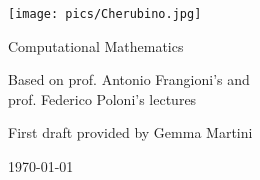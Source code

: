 \documentclass[preview,12pt]{article}
\begin{document}
\begin{titlepage}
\begin{center}
\vspace{3cm}

\Large

\vspace{2cm}

\texttt{[image: pics/Cherubino.jpg]}

\vspace{2.5cm}

{\Huge \sc Computational Mathematics}

\vspace{2cm}
Based on prof. Antonio Frangioni's and\\
  prof. Federico Poloni's lectures

\vspace{2cm}
First draft provided by Gemma Martini
\vfill

\today

\end{center}
\end{titlepage}


\tableofcontents
\let\tableofcontents\relax

\newpage



\newpage



\newpage



\newpage



\newpage



\newpage




\newpage



\newpage



\newpage



\newpage



\newpage
\end{document}
